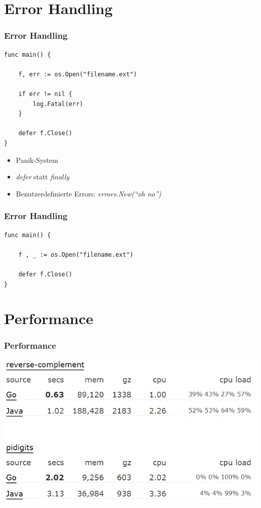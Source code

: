 \documentclass{beamer}
\begin{document}

\section{Error Handling}
\begin{frame}[fragile]
\frametitle{Error Handling}

\begin{lstlisting} 
func main() {

    f, err := os.Open("filename.ext")

    if err != nil {
        log.Fatal(err)
    }

    defer f.Close()
}
\end{lstlisting}

\begin{itemize}
\item Panik-System
\item \textit{defer} statt \textit{finally}
\item Benutzerdefinierte Errors: \textit{errors.New(``oh no'')}
\end{itemize}

\end{frame}

\begin{frame}[fragile]
\frametitle{Error Handling}

\begin{lstlisting} 
func main() {

    f , _ := os.Open("filename.ext")

    defer f.Close()
}
\end{lstlisting}

\end{frame}


\section{Performance}
\begin{frame}
\frametitle{Performance}

\centering
\includegraphics[scale=0.6]{performance1.png}

\end{frame}
\end{document}
